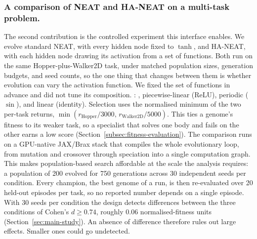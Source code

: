 \subsubsection{A comparison of NEAT and HA-NEAT on a multi-task problem.}
The second contribution is the controlled experiment this interface enables.
We evolve standard NEAT, with every hidden node fixed to $\tanh$, and HA-NEAT, with each hidden node drawing its activation from a set of functions.
Both run on the same Hopper-plus-Walker2D task, under matched population sizes, generation budgets, and seed counts, so the one thing that changes between them is whether evolution can vary the activation function.
We fixed the set of functions in advance and did not tune its composition.
: , piecewise-linear (ReLU), periodic ($\sin$), and linear (identity).
Selection uses the normalised minimum of the two per-task returns, $\min(r_{\text{Hopper}}/3000,\, r_{\text{Walker2D}}/5000)$.
This ties a genome's fitness to its weaker task, so a specialist that solves one body and fails on the other earns a low score (Section~\ref{subsec:fitness-evaluation}).
The comparison runs on a GPU-native JAX/Brax stack \parencite{freeman_brax_2021,wang_tensorized_2024} that compiles the whole evolutionary loop, from mutation and crossover through speciation into a single computation graph.
This makes population-based search affordable at the scale the analysis requires: a population of 200 evolved for 750 generations across 30 independent seeds per condition.
Every champion, the best genome of a run, is then re-evaluated over 20 held-out episodes per task, so no reported number depends on a single episode.
With 30 seeds per condition the design detects differences between the three conditions of Cohen's $d \geq 0.74$, roughly 0.06 normalised-fitness units (Section~\ref{sec:main-study}). An absence of difference therefore rules out large effects. Smaller ones could go undetected.

